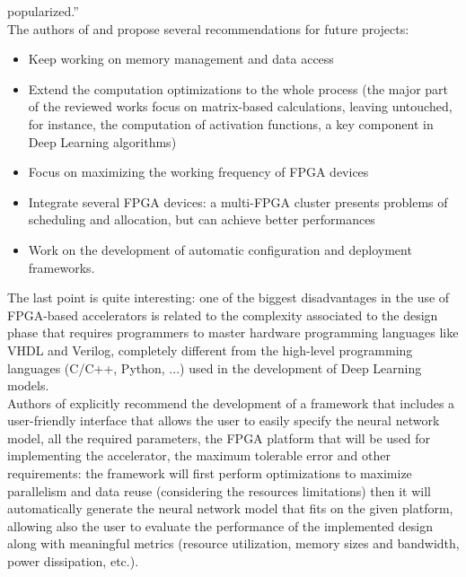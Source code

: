 \documentclass[11pt,a4paper]{article}
\begin{document}
popularized.''\\
The authors of \cite{wang_survey_2018} and \cite{shawahna_review_2019} propose several recommendations for future projects:
\begin{itemize}
    \item Keep working on memory management and data access
    \item Extend the computation optimizations to the whole process (the major part of the reviewed works focus on matrix-based calculations, leaving untouched, for instance, the computation of activation functions, a key component in Deep Learning algorithms)
    \item Focus on maximizing the working frequency of FPGA devices
    \item Integrate several FPGA devices: a multi-FPGA cluster presents problems of scheduling and allocation, but can achieve better performances
    \item Work on the development of automatic configuration and deployment frameworks.
\end{itemize}
The last point is quite interesting: one of the biggest disadvantages in the use of FPGA-based accelerators is related to the complexity associated to the design phase that requires programmers to master hardware programming languages like VHDL and Verilog, completely different from the high-level programming languages (C/C++, Python, ...) used in the development of Deep Learning models.\\
Authors of \cite{shawahna_review_2019} explicitly recommend the development of a framework that includes a user-friendly interface that allows the user to easily specify the neural network model, all the required parameters, the FPGA platform that will be used for implementing the accelerator, the maximum tolerable error and other requirements: the framework will first perform optimizations to maximize parallelism and data reuse (considering the resources limitations) then it will automatically generate the neural network model that fits on the given platform, allowing also the user to evaluate the performance of the implemented design along with meaningful metrics (resource utilization, memory sizes and bandwidth, power dissipation, etc.).
\end{document}
